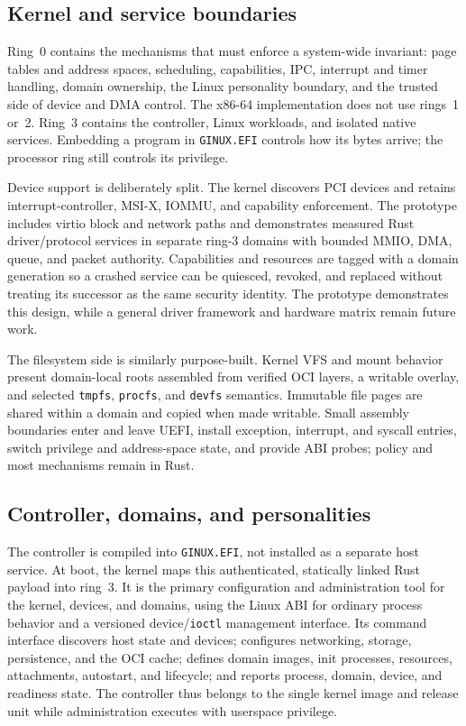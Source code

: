 \documentclass[11pt]{article}
\begin{document}
\subsection{Kernel and service boundaries}

Ring~0 contains the mechanisms that must enforce a system-wide invariant:
page tables and address spaces, scheduling, capabilities, IPC, interrupt and
timer handling, domain ownership, the Linux personality boundary, and the
trusted side of device and DMA control. The x86-64 implementation does not use
rings~1 or~2. Ring~3 contains the controller, Linux workloads, and isolated
native services. Embedding a program in \texttt{GINUX.EFI} controls how its
bytes arrive; the processor ring still controls its privilege.

Device support is deliberately split. The kernel discovers PCI devices and
retains interrupt-controller, MSI-X, IOMMU, and capability enforcement. The
prototype includes virtio block and network paths and demonstrates measured
Rust driver/protocol services in separate ring-3 domains with bounded MMIO,
DMA, queue, and packet authority. Capabilities and resources are tagged with a
domain generation so a crashed service can be quiesced, revoked, and replaced
without treating its successor as the same security identity. The prototype
demonstrates this design, while a general driver framework and hardware matrix
remain future work.

The filesystem side is similarly purpose-built. Kernel VFS and mount behavior
present domain-local roots assembled from verified OCI layers, a writable
overlay, and selected \texttt{tmpfs}, \texttt{procfs}, and \texttt{devfs}
semantics. Immutable file pages are shared within a domain and copied when made
writable. Small assembly boundaries enter and leave UEFI, install exception,
interrupt, and syscall entries, switch privilege and address-space state, and
provide ABI probes; policy and most mechanisms remain in Rust.

\subsection{Controller, domains, and personalities}

The controller is compiled into \texttt{GINUX.EFI}, not installed as a separate
host service. At boot, the kernel maps this authenticated, statically linked
Rust payload into ring~3. It is the primary configuration and administration
tool for the kernel, devices, and domains, using the Linux ABI for ordinary
process behavior and a versioned device/\texttt{ioctl} management interface.
Its command interface discovers host state and devices; configures networking,
storage, persistence, and the OCI cache; defines domain images, init processes,
resources, attachments, autostart, and lifecycle; and reports process, domain,
device, and readiness state. The controller thus belongs to the single kernel
image and release unit while administration executes with userspace privilege.
\end{document}
